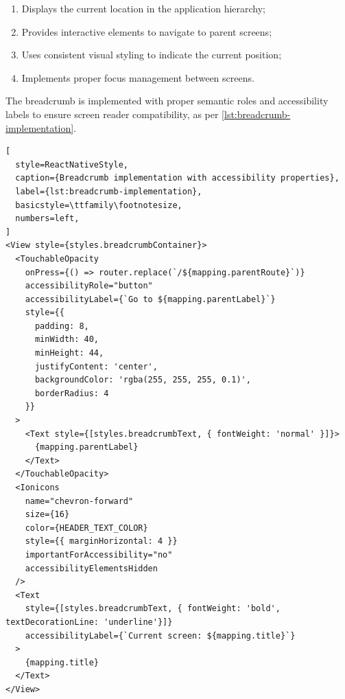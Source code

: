 \begin{enumerate}
    \item Displays the current location in the application hierarchy;
    \item Provides interactive elements to navigate to parent screens;
    \item Uses consistent visual styling to indicate the current position;
    \item Implements proper focus management between screens.
\end{enumerate}

The breadcrumb is implemented with proper semantic roles and accessibility labels to ensure screen reader compatibility, as per \ref{lst:breadcrumb-implementation}.

\begin{lstlisting}[
  style=ReactNativeStyle,
  caption={Breadcrumb implementation with accessibility properties},
  label={lst:breadcrumb-implementation},
  basicstyle=\ttfamily\footnotesize,
  numbers=left,
]
<View style={styles.breadcrumbContainer}>
  <TouchableOpacity
    onPress={() => router.replace(`/${mapping.parentRoute}`)}
    accessibilityRole="button"
    accessibilityLabel={`Go to ${mapping.parentLabel}`}
    style={{
      padding: 8,
      minWidth: 40,
      minHeight: 44,
      justifyContent: 'center',
      backgroundColor: 'rgba(255, 255, 255, 0.1)',
      borderRadius: 4
    }}
  >
    <Text style={[styles.breadcrumbText, { fontWeight: 'normal' }]}>
      {mapping.parentLabel}
    </Text>
  </TouchableOpacity>
  <Ionicons
    name="chevron-forward"
    size={16}
    color={HEADER_TEXT_COLOR}
    style={{ marginHorizontal: 4 }}
    importantForAccessibility="no"
    accessibilityElementsHidden
  />
  <Text
    style={[styles.breadcrumbText, { fontWeight: 'bold', textDecorationLine: 'underline'}]}
    accessibilityLabel={`Current screen: ${mapping.title}`}
  >
    {mapping.title}
  </Text>
</View>
\end{lstlisting}

